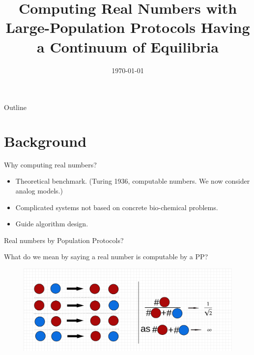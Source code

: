 \documentclass[aspectratio=169]{beamer}
\title[]{Computing Real Numbers with Large-Population Protocols Having a Continuum of Equilibria}
\date[]{\large{\today}}
\author[Xiang\,Huang \& Rachel.\,Huls]
{%
  \texorpdfstring{
    \begin{columns}%
      \column{.45\linewidth}
      \centering
      Xiang Huang\\
      \href{mailto:xhuan5@uis.edu}{(xhuan5@uis.edu)}\\
      \href{https://xianghuang.org}{xianghuang.org}
      \column{.45\linewidth}
      \centering
      Rachel Huls\\
      \href{mailto:rhuls2@uis.edu}{(rhuls2@uis.edu)}
    \end{columns}
  }
  {Xiang Huang \& Rachel Huls}
}
\institute{\Large{University of Illinois Springfield}} %
\begin{document}
\begin{frame}
\maketitle
\end{frame}

\begin{frame}{Outline}
\tableofcontents
\end{frame}

\section{Background}

\begin{frame}{Why computing real numbers?}
\begin{itemize}
    \item Theoretical benchmark. (Turing 1936, computable numbers. We now consider analog models.) \pause
    \item Complicated systems not based on concrete bio-chemical problems. \pause
    \item Guide algorithm design.
\end{itemize}
\end{frame}

\begin{frame}[Clean]{Real numbers by Population Protocols?}

What do we mean by saying a real number is computable by a PP?

\begin{example}
\begin{figure}[tb]
    \centering
    \includegraphics[scale=0.2]{ppexample1}
\end{figure}
\end{example}
\end{frame}
\end{document}
